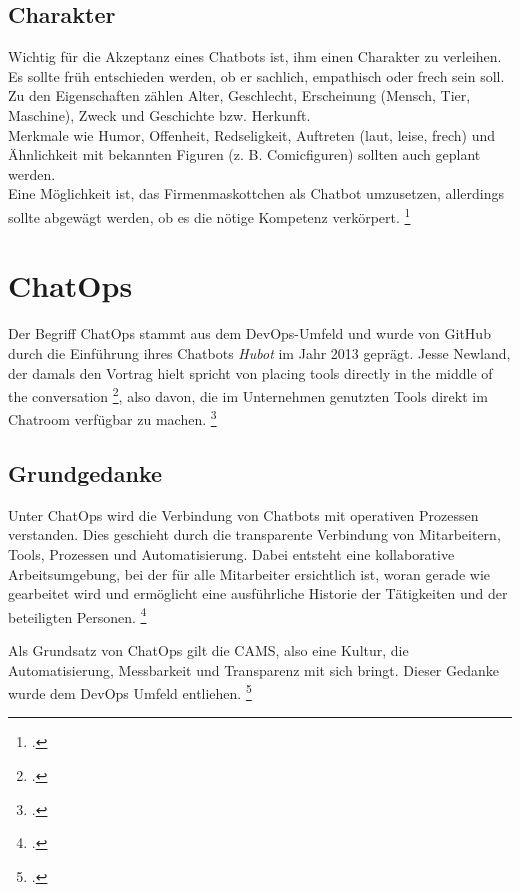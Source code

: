 \subsection{Charakter}
Wichtig für die Akzeptanz eines Chatbots ist, ihm einen Charakter zu verleihen. Es sollte früh entschieden werden, ob er sachlich, empathisch oder frech sein soll.\\
Zu den Eigenschaften zählen Alter, Geschlecht, Erscheinung (Mensch, Tier, Maschine), Zweck und Geschichte bzw. Herkunft.\\
Merkmale wie Humor, Offenheit, Redseligkeit, Auftreten (laut, leise, frech) und Ähnlichkeit mit bekannten Figuren (z. B. Comicfiguren) sollten auch geplant werden.\\
Eine Möglichkeit ist, das Firmenmaskottchen als Chatbot umzusetzen, allerdings sollte abgewägt werden, ob es die nötige Kompetenz verkörpert.
\footcite[Vgl.][68\psq]{Puscher_2018_Gut_zugehoert}




\section{ChatOps}
Der Begriff ChatOps stammt aus dem DevOps-Umfeld und wurde von GitHub durch die Einführung ihres Chatbots \textit{Hubot} im Jahr 2013 geprägt. Jesse Newland, der damals den Vortrag hielt spricht von \glqq{}placing tools
directly in the middle of the conversation\grqq
\footcite[Vgl.][62]{GitHub_2013_Chatops},
also davon, die im Unternehmen genutzten Tools direkt im Chatroom verfügbar zu machen.
\footcite[Vgl.][o. \pno]{Sigler_2014_Chatops}

\subsection{Grundgedanke}
Unter ChatOps wird die Verbindung von Chatbots mit operativen Prozessen verstanden. Dies geschieht durch die transparente Verbindung von Mitarbeitern, Tools, Prozessen und Automatisierung.
Dabei entsteht eine kollaborative Arbeitsumgebung, bei der für alle Mitarbeiter ersichtlich ist, woran gerade wie gearbeitet wird und ermöglicht eine ausführliche Historie der Tätigkeiten und der beteiligten Personen.
\footcites[Vgl.][o. \pno]{Zyane_2017_ChatOps}[Vgl.][190]{Betz_2016_Digital}

Als Grundsatz von ChatOps gilt die \acf{CAMS}, also eine Kultur, die Automatisierung, Messbarkeit und Transparenz mit sich bringt. Dieser Gedanke wurde dem DevOps Umfeld entliehen.
\footcite[Vgl.][o. \pno]{Zyane_2017_ChatOps}


